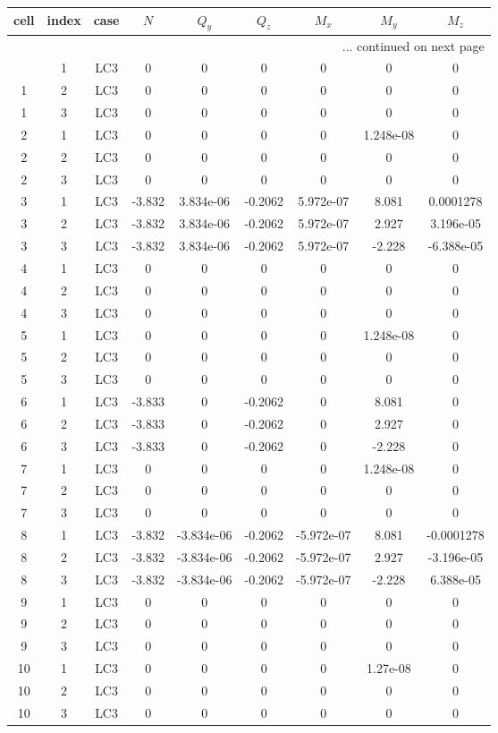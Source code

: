 \documentclass{article}%
\begin{document}
\begin{longtable}{| c c c | c c c c c c |}%
\hline%
cell&index&case&$N$&$Q_y$&$Q_z$&$M_x$&$M_y$&$M_z$\\%
\hline%
\endhead%
\hline%
\multicolumn{9}{r}{... continued on next page}\\%
\endfoot%
\hline%
\endlastfoot%
1&1&LC3&0&0&0&0&0&0\\%
1&2&LC3&0&0&0&0&0&0\\%
1&3&LC3&0&0&0&0&0&0\\%
2&1&LC3&0&0&0&0&1.248e{-}08&0\\%
2&2&LC3&0&0&0&0&0&0\\%
2&3&LC3&0&0&0&0&0&0\\%
3&1&LC3&{-}3.832&3.834e{-}06&{-}0.2062&5.972e{-}07&8.081&0.0001278\\%
3&2&LC3&{-}3.832&3.834e{-}06&{-}0.2062&5.972e{-}07&2.927&3.196e{-}05\\%
3&3&LC3&{-}3.832&3.834e{-}06&{-}0.2062&5.972e{-}07&{-}2.228&{-}6.388e{-}05\\%
4&1&LC3&0&0&0&0&0&0\\%
4&2&LC3&0&0&0&0&0&0\\%
4&3&LC3&0&0&0&0&0&0\\%
5&1&LC3&0&0&0&0&1.248e{-}08&0\\%
5&2&LC3&0&0&0&0&0&0\\%
5&3&LC3&0&0&0&0&0&0\\%
6&1&LC3&{-}3.833&0&{-}0.2062&0&8.081&0\\%
6&2&LC3&{-}3.833&0&{-}0.2062&0&2.927&0\\%
6&3&LC3&{-}3.833&0&{-}0.2062&0&{-}2.228&0\\%
7&1&LC3&0&0&0&0&1.248e{-}08&0\\%
7&2&LC3&0&0&0&0&0&0\\%
7&3&LC3&0&0&0&0&0&0\\%
8&1&LC3&{-}3.832&{-}3.834e{-}06&{-}0.2062&{-}5.972e{-}07&8.081&{-}0.0001278\\%
8&2&LC3&{-}3.832&{-}3.834e{-}06&{-}0.2062&{-}5.972e{-}07&2.927&{-}3.196e{-}05\\%
8&3&LC3&{-}3.832&{-}3.834e{-}06&{-}0.2062&{-}5.972e{-}07&{-}2.228&6.388e{-}05\\%
9&1&LC3&0&0&0&0&0&0\\%
9&2&LC3&0&0&0&0&0&0\\%
9&3&LC3&0&0&0&0&0&0\\%
10&1&LC3&0&0&0&0&1.27e{-}08&0\\%
10&2&LC3&0&0&0&0&0&0\\%
10&3&LC3&0&0&0&0&0&0\\%

\end{longtable}
\end{document}
